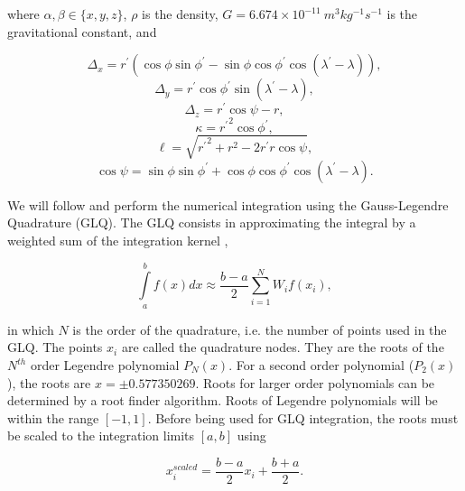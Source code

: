 \documentclass[paper,twocolumn,twoside]{geophysics}
\begin{document}
\noindent
where $\alpha, \beta \in \{x, y, z\}$,
$\rho$ is the density,
$G = 6.674\times10^{-11}\ m^3kg^{-1}s^{-1}$ is the gravitational constant,
and

\begin{equation}
    \Delta_x = r^\prime(\cos\phi\sin\phi^\prime - \sin\phi\cos\phi^\prime
               \cos(\lambda^\prime - \lambda)),
\end{equation}
\begin{equation}
    \Delta_y = r^\prime \cos \phi^\prime \sin(\lambda^\prime - \lambda),
\end{equation}
\begin{equation}
    \Delta_z = r^\prime \cos \psi - r,
\end{equation}
\begin{equation}
    \kappa = {r^\prime}^2 \cos \phi^\prime,
\end{equation}
\begin{equation}
    \ell = \sqrt{{r^\prime}^2 + r^2 - 2 r^\prime r \cos \psi},
\end{equation}
\begin{equation}
    \cos\psi = \sin\phi\sin\phi^\prime + \cos\phi\cos\phi^\prime
                 \cos(\lambda^\prime - \lambda).
\end{equation}

We will follow \citet{Asgharzadeh2007} and perform the numerical integration
using the Gauss-Legendre Quadrature (GLQ).
The GLQ consists in approximating the integral by a weighted sum of the
integration kernel \citep{Hildebrand1987},

\begin{equation}
    \int\limits_a^b f(x) dx \approx
    \frac{b-a}{2}\sum\limits_{i=1}^N W_i f(x_i),
    \label{eq:glq1d}
\end{equation}

\noindent
in which $N$ is the order of the quadrature,
i.e. the number of points used in the GLQ.
The points $x_i$ are called the quadrature nodes.
They are the roots of the $N^{th}$ order Legendre polynomial $P_N(x)$.
For a second order polynomial ($P_2(x)$),
the roots are $x = \pm 0.577350269$.
Roots for larger order polynomials
can be determined by a root finder algorithm.
Roots of Legendre polynomials
will be within the range $[-1, 1]$.
Before being used for GLQ integration,
the roots must be scaled to the integration limits $[a, b]$ using

\begin{equation}
    x^{scaled}_i = \frac{b - a}{2} x_i + \frac{b + a}{2}.
    \label{eq:glq_scaling}
\end{equation}
\end{document}
